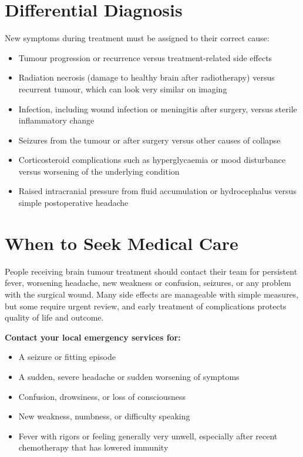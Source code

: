 \section*{Differential Diagnosis}
New symptoms during treatment must be assigned to their correct cause:

\begin{itemize}
    \item Tumour progression or recurrence versus treatment-related side effects
    \item Radiation necrosis (damage to healthy brain after radiotherapy) versus recurrent tumour, which can look very similar on imaging
    \item Infection, including wound infection or meningitis after surgery, versus sterile inflammatory change
    \item Seizures from the tumour or after surgery versus other causes of collapse
    \item Corticosteroid complications such as hyperglycaemia or mood disturbance versus worsening of the underlying condition
    \item Raised intracranial pressure from fluid accumulation or hydrocephalus versus simple postoperative headache
\end{itemize}

\section*{When to Seek Medical Care}
People receiving brain tumour treatment should contact their team for persistent fever, worsening headache, new weakness or confusion, seizures, or any problem with the surgical wound. Many side effects are manageable with simple measures, but some require urgent review, and early treatment of complications protects quality of life and outcome.

\textbf{Contact your local emergency services for:}
\begin{itemize}
    \item A seizure or fitting episode
    \item A sudden, severe headache or sudden worsening of symptoms
    \item Confusion, drowsiness, or loss of consciousness
    \item New weakness, numbness, or difficulty speaking
    \item Fever with rigors or feeling generally very unwell, especially after recent chemotherapy that has lowered immunity
\end{itemize}

